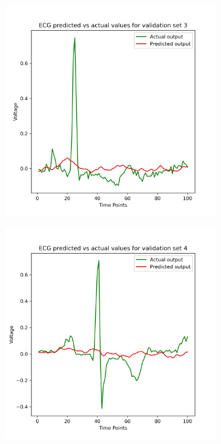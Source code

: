 \documentclass[11pt]{article}
\begin{document}
\begin{figure}
\begin{subfigure}[b]{0.18\textwidth}
		\label{fig:val_pred_given_nn_2}
	\end{subfigure}
	\begin{subfigure}[b]{0.18\textwidth}
		\centering
		\includegraphics[width=\textwidth]{prediction_plot_3.jpg}
		\label{fig:val_pred_given_nn_3}
	\end{subfigure}
	\begin{subfigure}[b]{0.18\textwidth}
		\centering
		\includegraphics[width=\textwidth]{prediction_plot_4.jpg}

\end{subfigure}
\end{figure}
\end{document}
